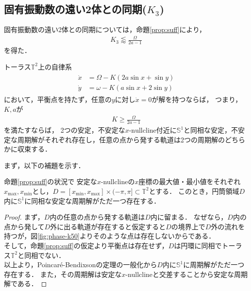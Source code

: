 \documentclass[../main]{subfiles}
\begin{document}
    \subsection{固有振動数の遠い2体との同期($K_3$)}
    固有振動数の遠い2体との同期については，命題\ref{prop:suff}により，
    \begin{align*}
        K_3\lessapprox \frac{\Omega}{2a-1}
    \end{align*}
    を得た．
    \begin{proposition}
        \label{prop:suff}
        トーラス$\mathbb{T}^2$上の自律系
        \begin{align}
            \label{eq:prop-2phase}
            \begin{split}
                \dot{x}&=\Omega-K(2a\sin x+\sin y)\\
                \dot{y}&=\omega-K(a\sin x+2\sin y)
            \end{split}
        \end{align}
        において，平衡点を持たず，任意の$y$に対し$\dot{x}=0$が解を持つならば，
        つまり，$K,a$が
        \begin{align*}
            K\geq \frac{\Omega}{2a-1}
        \end{align*}
        を満たすならば，
        2つの安定，不安定な$x$-$\mathrm{nullcline}$付近に$\mathbb{S}^1$と同相な安定，不安定な周期解がそれぞれ存在し，任意の点から発する軌道は2つの周期解のどちらかに収束する．
    \end{proposition}
    まず，以下の補題を示す．
    \begin{lemma}
        \label{lemma:annulus}
        命題\ref{prop:suff}の状況で
        安定な$x$-nullclineの$x$座標の最大値・最小値をそれぞれ$x_{\max},x_{\min}$とし，$D=[x_{\min},x_{\max}]\times (-\pi,\pi ]\subset\mathbb{T}^2$とする．
        このとき，円筒領域$D$内に$\mathbb{S}^1$に同相な安定な周期解がただ一つ存在する．        
    \end{lemma}
    \begin{proof}
        まず，$D$内の任意の点から発する軌道は$D$内に留まる．
        なぜなら，$D$内の点から発して$D$外に出る軌道が存在すると仮定すると$D$の境界上で$D$外の流れを持つが，図\ref{fig:phase-k50}よりそのような点は存在しないからである．\\
        そして，命題\ref{prop:suff}の仮定より平衡点は存在せず，$D$は円環に同相でトーラス$\mathbb{T}^2$と同相でない．\\
        以上より，Poincaré-Bendixsonの定理の一般化から$D$内に$\mathbb{S}^1$に周期解がただ一つ存在する．
        また，その周期解は安定な$x$-nullclineと交差することから安定な周期解である．        
    \end{proof}
\end{document}
